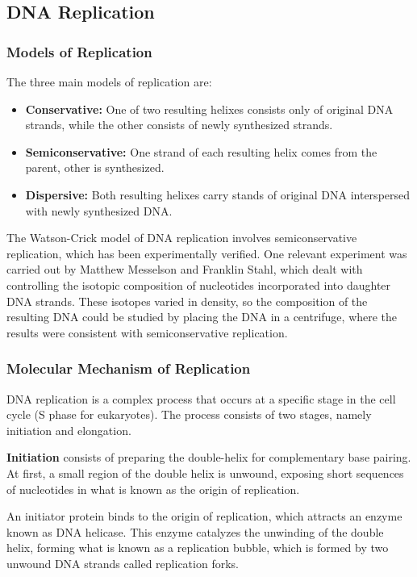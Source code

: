 \documentclass[12pt,titlepage]{article}
\begin{document}
      \subsection{DNA Replication}
        \subsubsection{Models of Replication}
          The three main models of replication are:
          \begin{itemize}
            \item \textbf{Conservative:} One of two resulting helixes consists only of original DNA strands, while the other consists of newly synthesized strands.
            \item \textbf{Semiconservative:} One strand of each resulting helix comes from the parent, other is synthesized.
            \item \textbf{Dispersive:} Both resulting helixes carry stands of original DNA interspersed with newly synthesized DNA.
          \end{itemize}

          The Watson-Crick model of DNA replication involves semiconservative replication, which has been experimentally verified. One relevant experiment was carried
          out by Matthew Messelson and Franklin Stahl, which dealt with controlling the isotopic composition of nucleotides incorporated into daughter DNA strands. These
          isotopes varied in density, so the composition of the resulting DNA could be studied by placing the DNA in a centrifuge, where the results were consistent with
          semiconservative replication.

        \subsubsection{Molecular Mechanism of Replication}
          DNA replication is a complex process that occurs at a specific stage in the cell cycle (S phase for eukaryotes). The process consists of two stages, namely
          initiation and elongation.

          \textbf{Initiation} consists of preparing the double-helix for complementary base pairing. At first, a small region of the double helix is unwound, exposing
          short sequences of nucleotides in what is known as the origin of replication.

          An initiator protein binds to the origin of replication, which attracts an enzyme known as DNA helicase. This enzyme catalyzes the unwinding of the double
          helix, forming what is known as a replication bubble, which is formed by two unwound DNA strands called replication forks.
\end{document}
